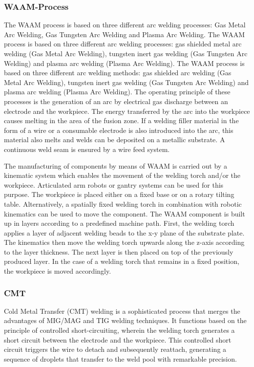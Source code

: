 \subsubsection{WAAM-Process}
The WAAM process is based on three different arc welding processes: Gas Metal Arc Welding, Gas Tungsten Arc Welding and Plasma Arc Welding. The WAAM process is based on three different arc welding processes: gas shielded metal arc welding (Gas Metal Arc Welding), tungsten inert gas welding (Gas Tungsten Arc Welding) and plasma arc welding (Plasma Arc Welding). The WAAM process is based on three different arc welding methods: gas shielded arc welding (Gas Metal Arc Welding), tungsten inert gas welding (Gas Tungsten Arc Welding) and plasma arc welding (Plasma Arc Welding). The operating principle of these processes is the generation of an arc by electrical gas discharge between an electrode and the workpiece. The energy transferred by the arc into the workpiece causes melting in the area of the fusion zone. If a welding filler material in the form of a wire or a consumable electrode is also introduced into the arc, this material also melts and welds can be deposited on a metallic substrate. A continuous weld seam is ensured by a wire feed system.

The manufacturing of components by means of WAAM is carried out by a kinematic system which enables the movement of the welding torch and/or the workpiece. Articulated arm robots or gantry systems can be used for this purpose. The workpiece is placed either on a fixed base or on a rotary tilting table. Alternatively, a spatially fixed welding torch in combination with robotic kinematics can be used to move the component. The WAAM component is built up in layers according to a predefined machine path. First, the welding torch applies a layer of adjacent welding beads to the x-y plane of the substrate plate. The kinematics then move the welding torch upwards along the z-axis according to the layer thickness. The next layer is then placed on top of the previously produced layer. In the case of a welding torch that remains in a fixed position, the workpiece is moved accordingly.

\subsubsection{CMT}
Cold Metal Transfer (CMT) welding is a sophisticated process that merges the advantages of MIG/MAG and TIG welding techniques. It functions based on the principle of controlled short-circuiting, wherein the welding torch generates a short circuit between the electrode and the workpiece. This controlled short circuit triggers the wire to detach and subsequently reattach, generating a sequence of droplets that transfer to the weld pool with remarkable precision.

